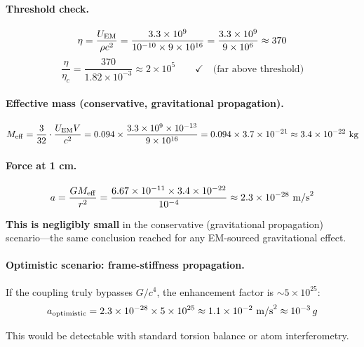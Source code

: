 \documentclass[12pt,a4paper]{article}
\begin{document}
\paragraph{Threshold check.}
\begin{equation}
\eta = \frac{U_{\rm EM}}{\rho c^2} = \frac{3.3 \times 10^9}{10^{-10} \times 9 \times 10^{16}}
= \frac{3.3 \times 10^9}{9 \times 10^6} \approx 370
\end{equation}
\begin{equation}
\frac{\eta}{\eta_c} = \frac{370}{1.82 \times 10^{-3}} \approx 2 \times 10^5
\qquad \checkmark \quad \text{(far above threshold)}
\end{equation}

\paragraph{Effective mass (conservative, gravitational propagation).}
\begin{equation}
M_{\rm eff} = \frac{3}{32} \cdot \frac{U_{\rm EM} V}{c^2}
= 0.094 \times \frac{3.3 \times 10^9 \times 10^{-13}}{9 \times 10^{16}}
= 0.094 \times 3.7 \times 10^{-21}
\approx 3.4 \times 10^{-22}~\text{kg}
\end{equation}

\paragraph{Force at 1 cm.}
\begin{equation}
a = \frac{G M_{\rm eff}}{r^2}
= \frac{6.67 \times 10^{-11} \times 3.4 \times 10^{-22}}{10^{-4}}
\approx 2.3 \times 10^{-28}~\text{m/s}^2
\end{equation}

\textbf{This is negligibly small} in the conservative (gravitational propagation)
scenario---the same conclusion reached for any EM-sourced gravitational effect.

\paragraph{Optimistic scenario: frame-stiffness propagation.}
If the coupling truly bypasses $G/c^4$, the enhancement factor is $\sim 5 \times 10^{25}$:
\begin{equation}
a_{\rm optimistic} = 2.3 \times 10^{-28} \times 5 \times 10^{25}
\approx 1.1 \times 10^{-2}~\text{m/s}^2 \approx 10^{-3}\,g
\end{equation}

This would be detectable with standard torsion balance or atom interferometry.
\end{document}
